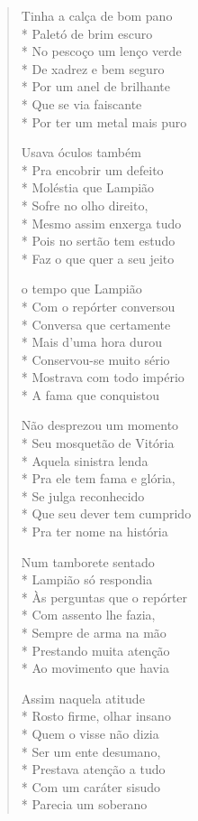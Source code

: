 \begin{verse}
Tinha a calça de bom pano\\*
Paletó de brim escuro\\*
No pescoço um lenço verde\\*
De xadrez e bem seguro\\*
Por um anel de brilhante\\*
Que se via faiscante\\*
Por ter um metal mais puro

Usava óculos também\\*
Pra encobrir um defeito\\*
Moléstia que Lampião\\*
Sofre no olho direito,\\*
Mesmo assim enxerga tudo\\*
Pois no sertão tem estudo\\*
Faz o que quer a seu jeito

o tempo que Lampião\\*
Com o repórter conversou\\*
Conversa que certamente\\*
Mais d'uma hora durou\\*
Conservou-se muito sério\\*
Mostrava com todo império\\*
A fama que conquistou

Não desprezou um momento\\*
Seu mosquetão de Vitória\\*
Aquela sinistra lenda\\*
Pra ele tem fama e glória,\\*
Se julga reconhecido\\*
Que seu dever tem cumprido\\*
Pra ter nome na história

Num tamborete sentado\\*
Lampião só respondia\\*
Às perguntas que o repórter\\*
Com assento lhe fazia,\\*
Sempre de arma na mão\\*
Prestando muita atenção\\*
Ao movimento que havia

Assim naquela atitude\\*
Rosto firme, olhar insano\\*
Quem o visse não dizia\\*
Ser um ente desumano,\\*
Prestava atenção a tudo\\*
Com um caráter sisudo\\*
Parecia um soberano


\end{verse}
